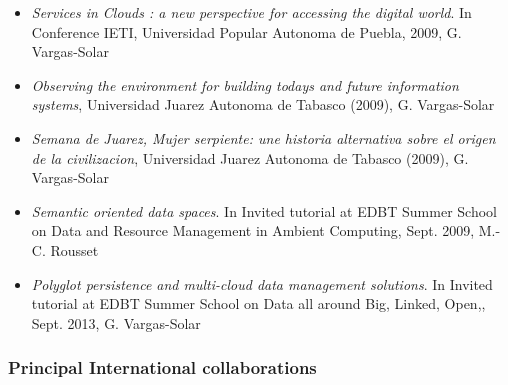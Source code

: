 \begin{itemize}
\item \emph{Services in Clouds : a new perspective for accessing the digital world}. In Conference IETI, Universidad Popular Autonoma de Puebla, 2009, G. Vargas-Solar


\item \emph{Observing the environment for building todays and future information systems}, Universidad Juarez Autonoma de Tabasco (2009), G. Vargas-Solar

\item \emph{Semana de Juarez, Mujer serpiente: une historia alternativa sobre el origen de la civilizacion}, Universidad Juarez Autonoma de Tabasco (2009), G. Vargas-Solar

\item \emph{Semantic oriented data spaces}. In Invited tutorial at EDBT Summer School on Data and Resource Management in Ambient Computing, Sept. 2009, M.-C. Rousset

\item \emph{Polyglot persistence and multi-cloud data management solutions}. In Invited tutorial at EDBT Summer School on Data all around
Big, Linked, Open,, Sept. 2013, G. Vargas-Solar 


\end{itemize}



\subsubsection{Principal International collaborations}

